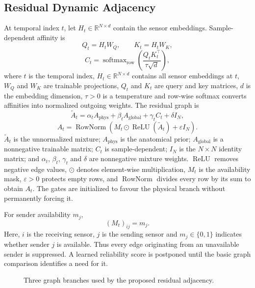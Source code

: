 \documentclass[12pt,a4paper,twoside,openright]{report}
\begin{document}
\subsection{Residual Dynamic Adjacency}
At temporal index $t$, let $H_t\in\mathbb{R}^{N\times d}$ contain the sensor embeddings. Sample-dependent affinity is
\[
Q_t=H_tW_Q,\qquad K_t=H_tW_K,
\]
\[
C_t=\operatorname{softmax}_{\mathrm{row}}
\left(\frac{Q_tK_t^{\top}}{\tau\sqrt d}\right),
\]
where $t$ is the temporal index, $H_t\in\mathbb{R}^{N\times d}$ contains all sensor embeddings at $t$, $W_Q$ and $W_K$ are trainable projections, $Q_t$ and $K_t$ are query and key matrices, $d$ is the embedding dimension, $\tau>0$ is a temperature and row-wise softmax converts affinities into normalized outgoing weights. The residual graph is
\[
\widetilde A_t=
\alpha_tA_{\mathrm{phys}}
+\beta_tA_{\mathrm{global}}
+\gamma_tC_t
+\delta I_N,
\]
\[
A_t=\operatorname{RowNorm}
\left(M_t\odot\operatorname{ReLU}(\widetilde A_t)+\varepsilon I_N\right).
\]
$\widetilde A_t$ is the unnormalized mixture; $A_{\mathrm{phys}}$ is the anatomical prior; $A_{\mathrm{global}}$ is a nonnegative trainable matrix; $C_t$ is sample-dependent; $I_N$ is the $N\times N$ identity matrix; and $\alpha_t$, $\beta_t$, $\gamma_t$ and $\delta$ are nonnegative mixture weights. $\operatorname{ReLU}$ removes negative edge values, $\odot$ denotes element-wise multiplication, $M_t$ is the availability mask, $\varepsilon>0$ protects empty rows, and $\operatorname{RowNorm}$ divides every row by its sum to obtain $A_t$. The gates are initialized to favour the physical branch without permanently forcing it.

For sender availability $m_j$,
\[
(M_t)_{ij}=m_j.
\]
Here, $i$ is the receiving sensor, $j$ is the sending sensor and $m_j\in\{0,1\}$ indicates whether sender $j$ is available. Thus every edge originating from an unavailable sender is suppressed. A learned reliability score is postponed until the basic graph comparison identifies a need for it.

\begin{figure}[hbt!]
\centering
{}
\caption{Three graph branches used by the proposed residual adjacency.}
\label{fig:graph-branches}
\end{figure}
\end{document}
